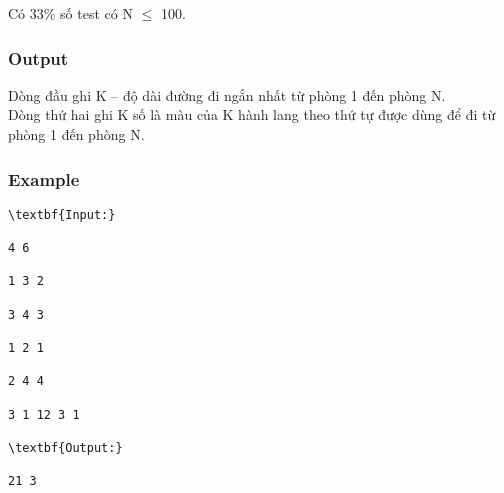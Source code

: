    Có 33\% số test có N  $\le$  100.  

\subsubsection{   Output  }

   Dòng đầu ghi K – độ dài đường đi ngắn nhất từ phòng 1 đến phòng N.   
\\   Dòng thứ hai ghi K số là màu của K hành lang theo thứ tự được dùng để đi từ phòng 1 đến phòng N.  

\subsubsection{   Example  }
\begin{verbatim}
\textbf{Input:}

4 6

1 3 2

3 4 3

1 2 1

2 4 4

3 1 12 3 1 

\textbf{Output:}

21 3\end{verbatim}
